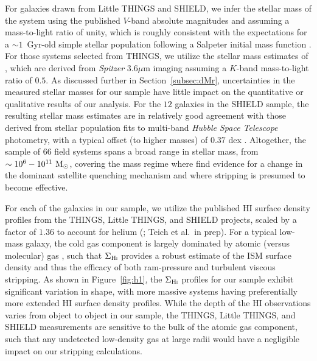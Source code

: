 For galaxies drawn from Little THINGS and SHIELD, we infer the stellar
mass of the system using the published $V$-band absolute magnitudes
\citep{hunter12, hauerberg15} and assuming a mass-to-light ratio of
unity, which is roughly consistent with the expectations for a
$\sim1$~Gyr-old simple stellar population following a Salpeter initial
mass function \citep[e.g.][]{maraston98}.
%
For those systems selected from THINGS, we utilize the stellar mass
estimates of \citet{leroy08}, which are derived from {\it Spitzer}
3.6$\mu$m imaging assuming a $K$-band mass-to-light ratio of $0.5$.
%
As discussed further in Section~\ref{subsec:dMr}, uncertainties in the
measured stellar masses for our sample have little impact on the
quantitative or qualitative results of our analysis.
%
For the $12$ galaxies in the SHIELD sample, the resulting stellar mass
estimates are in relatively good agreement with those derived from
stellar population fits to multi-band {\it Hubble Space Telescope}
photometry, with a typical offset (to higher masses) of $0.37$ dex
\citep{mcquinn15}.
%
Altogether, the sample of $66$ field systems spans a broad range in
stellar mass, from $\sim10^{6}-10^{11}~{\rm M}_{\odot}$, covering the mass
regime where \citet{fham15} find evidence for a change in the dominant
satellite quenching mechanism and where stripping is presumed to
become effective.
%

For each of the galaxies in our sample, we utilize the published
H{\scriptsize I} surface density profiles from the THINGS, Little
THINGS, and SHIELD projects, scaled by a factor of $1.36$ to account
for helium (\citealt{leroy08, hunter12, teich15}; Teich et al.~in
prep).
%
For a typical low-mass galaxy, the cold gas component is largely
dominated by atomic (versus molecular) gas \citep[e.g.][]{popping14,
  boselli14}, such that $\Sigma_{\rm H\scalebox{0.45}{\rm I}}$
provides a robust estimate of the ISM surface density and thus the
efficacy of both ram-pressure and turbulent viscous stripping.
%
As shown in Figure~\ref{fig:h1}, the $\Sigma_{\rm H\scalebox{0.45}{\rm
    I}}$ profiles for our sample exhibit significant variation in
shape, with more massive systems having preferentially more extended
H{\scriptsize I} surface density profiles.
%
While the depth of the H{\scriptsize I} observations varies from
object to object in our sample, the THINGS, Little THINGS, and SHIELD
measurements are sensitive to the bulk of the atomic gas component,
such that any undetected low-density gas at large radii would have a
negligible impact on our stripping calculations. 
%

